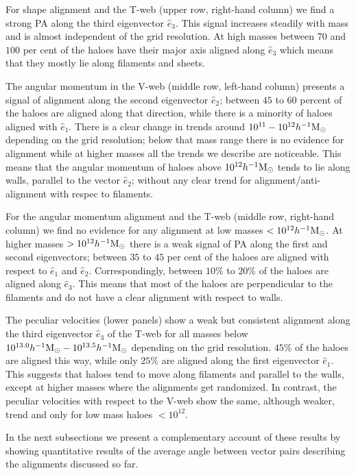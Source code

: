 \documentclass[useAMS,usenatbib]{mn2e}
\newcommand{\hMsun}{{\ifmmode{h^{-1}{\rm
        {M_{\odot}}}}\else{$h^{-1}{\rm{M_{\odot}}}$~}\fi}}
\begin{document}
For shape alignment and the T-web (upper row, right-hand column) we
find a strong PA along the third eigenvector $\hat{e}_{3}$. This  
signal increases steadily with mass and is almost independent of the
grid resolution. At high masses between $70$ and $100$ per cent of the
haloes have their major axis aligned along $\hat{e}_{3}$ which means
that they mostly lie along filaments and sheets.

The angular momentum in the V-web (middle row, left-hand column) presents 
a signal of alignment along the second eigenvector $\hat{e}_{2}$;
between $45$ to $60$ percent of the haloes are aligned along that
direction, while there is a minority of haloes aligned with
$\hat{e}_{1}$.  There is a clear change in trends around
$10^{11}-10^{12}\hMsun$ depending on the grid resolution;
below that mass range there is no evidence for alignment while at
higher masses all the trends we describe are noticeable. This means
that the angular momentum of haloes above $10^{12}\hMsun$ tends to lie
along walls, parallel to the vector $\hat{e}_2$; without any clear
trend for alignment/anti-alignment with respec to filaments.


For the angular momentum alignment and the T-web (middle row, right-hand
column) we find no evidence for any alignment at low masses $<10^{12}\hMsun$.
At higher masses $>10^{12}\hMsun$ there is a weak signal
of PA along the first and second eigenvectors;
between $35$ to $45$ per cent of the haloes are aligned with respect to
$\hat{e}_1$ and $\hat{e}_2$. Correspondingly, between $10\%$ to $20\%$
of the haloes are aligned along $\hat{e}_{3}$. This means
that most of the haloes are perpendicular to the filaments and do not
have a clear alignment with respect to walls.

The peculiar velocities (lower panels) show a weak but consistent
alignment along the third eigenvector $\hat{e}_{3}$ of the T-web for
all masses below $10^{13.0}\hMsun-10^{13.5}\hMsun$ depending on the grid
resolution. $45\%$ of the haloes are aligned this way, while only $25\%$ are
aligned along the first eigenvector $\hat{e}_1$. This suggests that
haloes tend to move along filaments and parallel to the walls, except
at higher masses where the alignments get randomized.  In contrast,
the peculiar velocities with respect to the V-web show the same,
although weaker, trend and only for low mass haloes $<10^{12}$.


In the next subsections we present a complementary account of these
results by showing quantitative results of the average angle
between vector pairs describing the alignments discussed so far.
\end{document}
